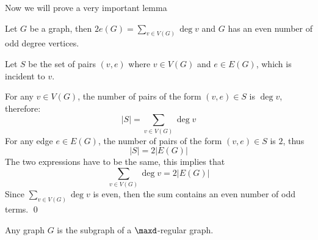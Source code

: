 Now we will prove a very important lemma
\begin{lemma}
    Let $G$ be a graph, then $2e(G) = \sum_{v \in V(G)}\deg{v}$ and $G$ has an even number of odd degree vertices.
\end{lemma}
\begin{prf}
    Let $S$ be the set of pairs $(v, e)$ where $v \in V(G)$ and $e \in E(G)$, which is incident to $v$.

    For any $v \in V(G)$, the number of pairs of the form $(v, e) \in S$ is $\deg{v}$, therefore:
    \begin{equation*}
        |S| = \sum_{v \in V(G)}\deg{v}
    \end{equation*}
    For any edge $e \in E(G)$, the number of pairs of the form $(v, e) \in S$ is $2$, thus
    \begin{equation*}
        |S| = 2|E(G)|
    \end{equation*}
    The two expressions have to be the same, this implies that
    \begin{equation*}
        \sum_{v \in V(G)}\deg{v} = 2|E(G)|
    \end{equation*}
    Since $\sum_{v \in V(G)}\deg{v}$ is even, then the sum contains an even number of odd terms. \qed
\end{prf}
\begin{pipo}
    Any graph $G$ is the subgraph of a $\maxd$-regular graph.
\end{pipo}
